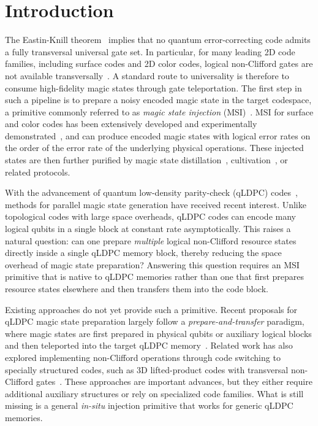 \section{Introduction}
The Eastin-Knill theorem~\cite{eastin_restrictions_2009} implies that no quantum error-correcting code admits a fully transversal universal gate set. In particular, for many leading 2D code families, including surface codes and 2D color codes, logical non-Clifford gates are not available transversally~\cite{bravyi_classification_2013}. A standard route to universality is therefore to consume high-fidelity magic states through gate teleportation. The first step in such a pipeline is to prepare a noisy encoded magic state in the target codespace, a primitive commonly referred to as \emph{magic state injection} (MSI)~\cite{li_magic_2015,lao_magic_2022,gidney_cleaner_2023}. MSI for surface and color codes has been extensively developed and experimentally demonstrated~\cite{daguerre_experimental_2025, dasu_breaking_2025, kim_magic_2024,rodriguez2024experimental}, and can produce encoded magic states with logical error rates on the order of the error rate of the underlying physical operations. These injected states are then further purified by magic state distillation~\cite{bravyi_magic_2012, bravyi_universal_2005,rodriguez2024experimental,xu_distilling_2026}, cultivation~\cite{chamberland_very_2020, chen_efficient_2025-1, gidney_magic_2024, sahay_fold-transversal_2025}, or related protocols.


With the advancement of quantum low-density parity-check (qLDPC) codes~\cite{panteleev_asymptotically_2022, 
panteleev_degenerate_2021, tillich_quantum_2014, kovalev_quantum_2013,breuckmann_quantum_2021,gottesman_fault-tolerant_2014}, methods for parallel magic state generation have received recent interest. 
Unlike topological codes with large space overheads, qLDPC codes can encode many logical qubits in a single block at constant rate asymptotically. 
This raises a natural question: can one prepare \emph{multiple} logical non-Clifford resource states directly inside a single qLDPC memory block, thereby reducing the space overhead of magic state preparation? Answering this question requires an MSI primitive that is native to qLDPC memories rather than one that first prepares resource states elsewhere and then transfers them into the code block.

Existing approaches do not yet provide such a primitive. 
Recent proposals for qLDPC magic state preparation largely follow a \emph{prepare-and-transfer} paradigm, where magic states are first prepared in physical qubits or auxiliary logical blocks and then teleported into the target qLDPC memory~\cite{zhang_constant-overhead_2025,xu_batched_2025}. Related work has also explored implementing non-Clifford operations through code switching to specially structured codes, such as 3D lifted-product codes with transversal non-Clifford gates~\cite{li_transversal_2025}. These approaches are important advances, but they either require additional auxiliary structures or rely on specialized code families. What is still missing is a general \emph{in-situ} injection primitive that works for generic qLDPC memories.

